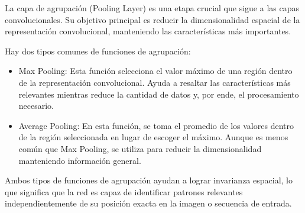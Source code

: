 La capa de agrupación (Pooling Layer) es una etapa crucial que sigue a las capas convolucionales. Su objetivo principal es reducir la dimensionalidad espacial de la representación convolucional, manteniendo las características más importantes.

Hay dos tipos comunes de funciones de agrupación:

\begin{itemize}
	
	\item Max Pooling: Esta función selecciona el valor máximo de una región dentro de la representación convolucional. Ayuda a resaltar las características más relevantes mientras reduce la cantidad de datos y, por ende, el procesamiento necesario.
	
	\item Average Pooling: En esta función, se toma el promedio de los valores dentro de la región seleccionada en lugar de escoger el máximo. Aunque es menos común que Max Pooling, se utiliza para reducir la dimensionalidad manteniendo información general.
	
\end{itemize}

Ambos tipos de funciones de agrupación ayudan a lograr invarianza espacial, lo que significa que la red es capaz de identificar patrones relevantes independientemente de su posición exacta en la imagen o secuencia de entrada.

